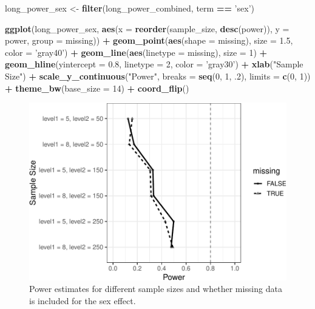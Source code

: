 \documentclass[man,mask,floatsintext]{apa6}
\newenvironment{Shaded}{\begin{snugshade}}{\end{snugshade}}
\newcommand{\DataTypeTok}[1]{\textcolor[rgb]{0.13,0.29,0.53}{#1}}
\newcommand{\DecValTok}[1]{\textcolor[rgb]{0.00,0.00,0.81}{#1}}
\newcommand{\FloatTok}[1]{\textcolor[rgb]{0.00,0.00,0.81}{#1}}
\newcommand{\KeywordTok}[1]{\textcolor[rgb]{0.13,0.29,0.53}{\textbf{#1}}}
\newcommand{\NormalTok}[1]{#1}
\newcommand{\OperatorTok}[1]{\textcolor[rgb]{0.81,0.36,0.00}{\textbf{#1}}}
\newcommand{\StringTok}[1]{\textcolor[rgb]{0.31,0.60,0.02}{#1}}
\begin{document}
\begin{Shaded}
\begin{Highlighting}[]
\NormalTok{long_power_sex <-}\StringTok{ }\KeywordTok{filter}\NormalTok{(long_power_combined, term }\OperatorTok{==}\StringTok{ 'sex'}\NormalTok{)}

\KeywordTok{ggplot}\NormalTok{(long_power_sex, }\KeywordTok{aes}\NormalTok{(}\DataTypeTok{x =} \KeywordTok{reorder}\NormalTok{(sample_size, }\KeywordTok{desc}\NormalTok{(power)), }\DataTypeTok{y =}\NormalTok{ power, }
                          \DataTypeTok{group =}\NormalTok{ missing)) }\OperatorTok{+}\StringTok{ }
\StringTok{  }\KeywordTok{geom_point}\NormalTok{(}\KeywordTok{aes}\NormalTok{(}\DataTypeTok{shape =}\NormalTok{ missing), }\DataTypeTok{size =} \FloatTok{1.5}\NormalTok{, }\DataTypeTok{color =} \StringTok{'gray40'}\NormalTok{) }\OperatorTok{+}\StringTok{ }
\StringTok{  }\KeywordTok{geom_line}\NormalTok{(}\KeywordTok{aes}\NormalTok{(}\DataTypeTok{linetype =}\NormalTok{ missing), }\DataTypeTok{size =} \DecValTok{1}\NormalTok{) }\OperatorTok{+}
\StringTok{  }\KeywordTok{geom_hline}\NormalTok{(}\DataTypeTok{yintercept =} \FloatTok{0.8}\NormalTok{, }\DataTypeTok{linetype =} \DecValTok{2}\NormalTok{, }\DataTypeTok{color =} \StringTok{'gray30'}\NormalTok{) }\OperatorTok{+}\StringTok{ }
\StringTok{  }\KeywordTok{xlab}\NormalTok{(}\StringTok{"Sample Size"}\NormalTok{) }\OperatorTok{+}\StringTok{ }
\StringTok{  }\KeywordTok{scale_y_continuous}\NormalTok{(}\StringTok{"Power"}\NormalTok{, }\DataTypeTok{breaks =} \KeywordTok{seq}\NormalTok{(}\DecValTok{0}\NormalTok{, }\DecValTok{1}\NormalTok{, }\FloatTok{.2}\NormalTok{), }\DataTypeTok{limits =} \KeywordTok{c}\NormalTok{(}\DecValTok{0}\NormalTok{, }\DecValTok{1}\NormalTok{)) }\OperatorTok{+}
\StringTok{  }\KeywordTok{theme_bw}\NormalTok{(}\DataTypeTok{base_size =} \DecValTok{14}\NormalTok{) }\OperatorTok{+}\StringTok{ }
\StringTok{  }\KeywordTok{coord_flip}\NormalTok{()}
\end{Highlighting}
\end{Shaded}

\begin{figure}
\centering
\includegraphics{power_simulation_files/figure-latex/long-power-curve-h-1.pdf}
\caption{\label{fig:long-power-curve-h}Power estimates for different sample sizes and whether missing data is included for the sex effect.}
\end{figure}
\end{document}
